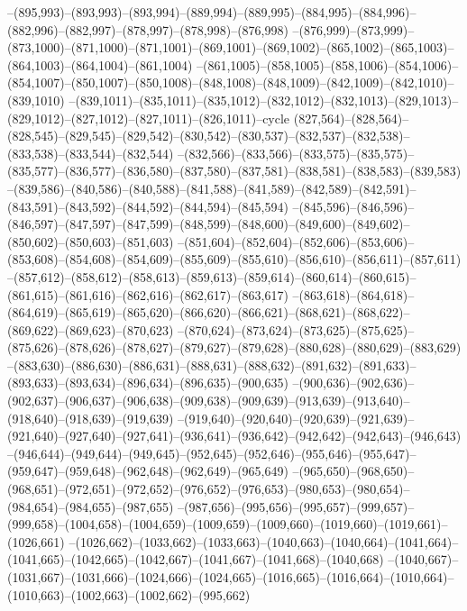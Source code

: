 --(895,993)--(893,993)--(893,994)--(889,994)--(889,995)--(884,995)--(884,996)--(882,996)--(882,997)--(878,997)--(878,998)--(876,998)
--(876,999)--(873,999)--(873,1000)--(871,1000)--(871,1001)--(869,1001)--(869,1002)--(865,1002)--(865,1003)--(864,1003)--(864,1004)--(861,1004)
--(861,1005)--(858,1005)--(858,1006)--(854,1006)--(854,1007)--(850,1007)--(850,1008)--(848,1008)--(848,1009)--(842,1009)--(842,1010)--(839,1010)
--(839,1011)--(835,1011)--(835,1012)--(832,1012)--(832,1013)--(829,1013)--(829,1012)--(827,1012)--(827,1011)--(826,1011)--cycle
(827,564)--(828,564)--(828,545)--(829,545)--(829,542)--(830,542)--(830,537)--(832,537)--(832,538)--(833,538)--(833,544)--(832,544)
--(832,566)--(833,566)--(833,575)--(835,575)--(835,577)--(836,577)--(836,580)--(837,580)--(837,581)--(838,581)--(838,583)--(839,583)
--(839,586)--(840,586)--(840,588)--(841,588)--(841,589)--(842,589)--(842,591)--(843,591)--(843,592)--(844,592)--(844,594)--(845,594)
--(845,596)--(846,596)--(846,597)--(847,597)--(847,599)--(848,599)--(848,600)--(849,600)--(849,602)--(850,602)--(850,603)--(851,603)
--(851,604)--(852,604)--(852,606)--(853,606)--(853,608)--(854,608)--(854,609)--(855,609)--(855,610)--(856,610)--(856,611)--(857,611)
--(857,612)--(858,612)--(858,613)--(859,613)--(859,614)--(860,614)--(860,615)--(861,615)--(861,616)--(862,616)--(862,617)--(863,617)
--(863,618)--(864,618)--(864,619)--(865,619)--(865,620)--(866,620)--(866,621)--(868,621)--(868,622)--(869,622)--(869,623)--(870,623)
--(870,624)--(873,624)--(873,625)--(875,625)--(875,626)--(878,626)--(878,627)--(879,627)--(879,628)--(880,628)--(880,629)--(883,629)
--(883,630)--(886,630)--(886,631)--(888,631)--(888,632)--(891,632)--(891,633)--(893,633)--(893,634)--(896,634)--(896,635)--(900,635)
--(900,636)--(902,636)--(902,637)--(906,637)--(906,638)--(909,638)--(909,639)--(913,639)--(913,640)--(918,640)--(918,639)--(919,639)
--(919,640)--(920,640)--(920,639)--(921,639)--(921,640)--(927,640)--(927,641)--(936,641)--(936,642)--(942,642)--(942,643)--(946,643)
--(946,644)--(949,644)--(949,645)--(952,645)--(952,646)--(955,646)--(955,647)--(959,647)--(959,648)--(962,648)--(962,649)--(965,649)
--(965,650)--(968,650)--(968,651)--(972,651)--(972,652)--(976,652)--(976,653)--(980,653)--(980,654)--(984,654)--(984,655)--(987,655)
--(987,656)--(995,656)--(995,657)--(999,657)--(999,658)--(1004,658)--(1004,659)--(1009,659)--(1009,660)--(1019,660)--(1019,661)--(1026,661)
--(1026,662)--(1033,662)--(1033,663)--(1040,663)--(1040,664)--(1041,664)--(1041,665)--(1042,665)--(1042,667)--(1041,667)--(1041,668)--(1040,668)
--(1040,667)--(1031,667)--(1031,666)--(1024,666)--(1024,665)--(1016,665)--(1016,664)--(1010,664)--(1010,663)--(1002,663)--(1002,662)--(995,662)
